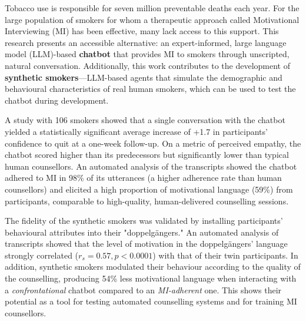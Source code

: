 Tobacco use is responsible for seven million preventable deaths each year. For the large population of smokers for whom a therapeutic approach called Motivational Interviewing (MI) has been effective, many lack access to this support. This research presents an accessible alternative: an expert-informed, large language model (LLM)-based \textbf{chatbot} that provides MI to smokers through unscripted, natural conversation. Additionally, this work contributes to the development of \textbf{synthetic smokers}---LLM-based agents that simulate the demographic and behavioural characteristics of real human smokers, which can be used to test the chatbot during development.

A study with 106 smokers showed that a single conversation with the chatbot yielded a statistically significant average increase of +1.7 in participants' confidence to quit at a one-week follow-up. On a metric of perceived empathy, the chatbot scored higher than its predecessors but significantly lower than typical human counsellors. An automated analysis of the transcripts showed the chatbot adhered to MI in 98\% of its utterances (a higher adherence rate than human counsellors) and elicited a high proportion of motivational language (59\%) from participants, comparable to high-quality, human-delivered counselling sessions.

The fidelity of the synthetic smokers was validated by installing participants' behavioural attributes into their "doppelgängers." An automated analysis of transcripts showed that the level of motivation in the doppelgängers' language strongly correlated ($r_{s}=0.57, p<0.0001$) with that of their twin participants. In addition, synthetic smokers modulated their behaviour according to the quality of the counselling, producing 54\% less motivational language when interacting with a \emph{confrontational} chatbot compared to an \emph{MI-adherent} one. This shows their potential as a tool for testing automated counselling systems and for training MI counsellors.
